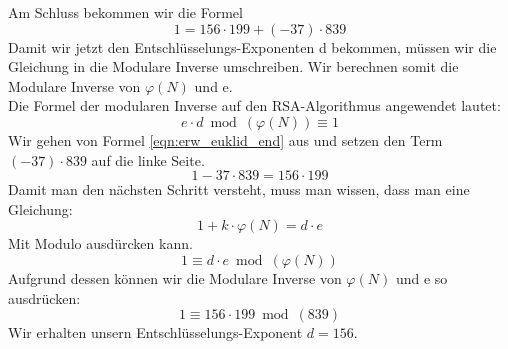 %
Am Schluss bekommen wir die Formel
%
\begin{equation}
 1 = 156 \cdot 199 + (-37) \cdot 839
 \label{eqn:erw_euklid_end}
\end{equation}
%
Damit wir jetzt den Entschlüsselungs-Exponenten d bekommen, müssen wir die Gleichung in die Modulare Inverse umschreiben. Wir berechnen somit die Modulare Inverse von $\varphi(N)$ und e.\\
Die Formel der modularen Inverse auf den RSA-Algorithmus angewendet lautet:
\begin{equation}
  e \cdot d \bmod(\varphi(N)) \equiv 1
\end{equation}
%
Wir gehen von Formel \ref{eqn:erw_euklid_end} aus und setzen den Term $(-37) \cdot 839$ auf die linke Seite.
%
\begin{equation*}
 1 - 37 \cdot 839 = 156 \cdot 199
\end{equation*}
Damit man den nächsten Schritt versteht, muss man wissen, dass man eine Gleichung:
\begin{equation*}
  1 + k \cdot \varphi(N) = d \cdot e
\end{equation*}
Mit Modulo ausdürcken kann.
\begin{equation*}
  1 \equiv d \cdot e \bmod(\varphi(N))
\end{equation*}
%
Aufgrund dessen können wir die Modulare Inverse von $\varphi(N)$ und e so ausdrücken:
%
\begin{equation*}
 1 \equiv 156 \cdot 199 \bmod(839)
\end{equation*}
Wir erhalten unsern Entschlüsselungs-Exponent $d = 156$.
%
%
%
%
%
%
